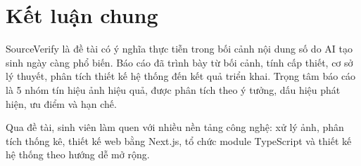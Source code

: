 \section{Kết luận chung}
SourceVerify là đề tài có ý nghĩa thực tiễn trong bối cảnh nội dung số do AI tạo sinh ngày càng phổ biến. Báo cáo đã trình bày từ bối cảnh, tính cấp thiết, cơ sở lý thuyết, phân tích thiết kế hệ thống đến kết quả triển khai. Trọng tâm báo cáo là 5 nhóm tín hiệu ảnh hiệu quả, được phân tích theo ý tưởng, dấu hiệu phát hiện, ưu điểm và hạn chế.

Qua đề tài, sinh viên làm quen với nhiều nền tảng công nghệ: xử lý ảnh, phân tích thống kê, thiết kế web bằng Next.js, tổ chức module TypeScript và thiết kế hệ thống theo hướng dễ mở rộng.
